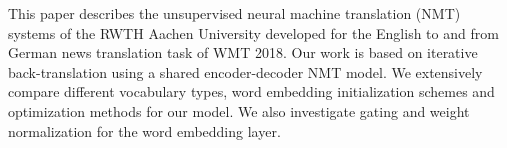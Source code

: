 This paper describes the unsupervised neural machine translation (NMT) systems of the RWTH Aachen University developed for the English to and from German news translation task of WMT 2018. Our work is based on iterative back-translation using a shared encoder-decoder NMT model. We extensively compare different vocabulary types, word embedding initialization schemes and optimization methods for our model. We also investigate gating and weight normalization for the word embedding layer.

